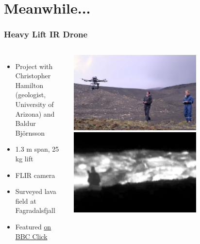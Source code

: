 \documentclass[aspectratio=169]{rubeamer}
\newif\ifpause
\newcommand{\mypause}{\ifpause \pause \fi}
\begin{document}
\section{Meanwhile...}

\begin{frame}
  \frametitle{Heavy Lift IR Drone}
  \begin{columns}
    \begin{itemize}
      \item Project with Christopher Hamilton (geologist, University of Arizona) and Baldur Björnsson
      \mypause
      \item 1.3 m span, 25 kg lift
      \mypause
      \item FLIR camera
      \mypause
      \item Surveyed lava field at Fagradalsfjall
      \mypause
      \item Featured \href{https://youtu.be/6SIgFPhhRPE?t=1208}{\color{blue}on BBC Click}
    \end{itemize}
    \centering
    \onslide
    \includegraphics[width=0.7\textwidth]{ir_drone_in_flight}
    \includegraphics[width=0.7\textwidth]{ir_drone_ir_stillframe}
  \end{columns}
\end{frame}
\end{document}
